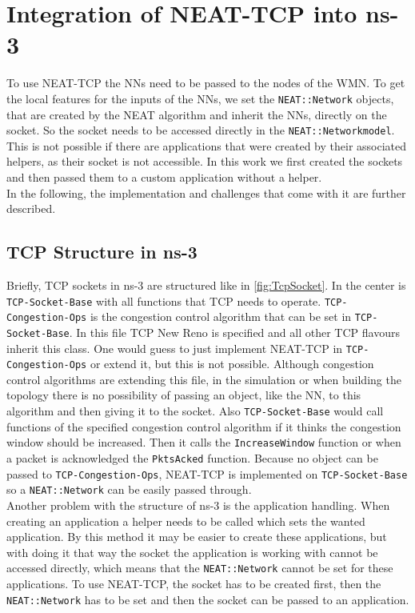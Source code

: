 \section{Integration of NEAT-TCP into ns-3}\label{sec:extensionns3}
To use NEAT-TCP the NNs need to be passed to the nodes of the WMN. To get the local features for the inputs of the NNs, we set the \texttt{NEAT::Network} objects, that are created by the NEAT algorithm and inherit the NNs, directly on the socket. 
So the socket needs to be accessed directly in the \texttt{NEAT::Networkmodel}. This is not possible if there are applications that were created by their associated helpers, as their socket is not accessible. In this work we first created the sockets and then passed them to a custom application without a helper. \\
In the following, the implementation and challenges that come with it are further described.

\subsection{TCP Structure in ns-3}\label{subsec:tcpstruct}
Briefly, TCP sockets in ns-3 are structured like in \autoref{fig:TcpSocket}. In the center is \texttt{TCP-Socket-Base} with all functions that TCP needs to operate. \texttt{TCP-Congestion-Ops} is the congestion control algorithm that can be set in \texttt{TCP-Socket-Base}. In this file TCP New Reno is specified and all other TCP flavours inherit this class. One would guess to just implement NEAT-TCP in \texttt{TCP-Congestion-Ops} or extend it, but this is not possible. Although congestion control algorithms are extending this file, in the simulation or when building the topology there is no possibility of passing an object, like the NN, to this algorithm and then giving it to the socket. Also \texttt{TCP-Socket-Base} would call functions of the specified congestion control algorithm if it thinks the congestion window should be increased. Then it calls the \texttt{IncreaseWindow} function or when a packet is acknowledged the \texttt{PktsAcked} function. Because no object can be passed to \texttt{TCP-Congestion-Ops}, NEAT-TCP is implemented on \texttt{TCP-Socket-Base} so a \texttt{NEAT::Network} can be easily passed through. \\
Another problem with the structure of ns-3 is the application handling. When creating an application a helper needs to be called which sets the wanted application. By this method it may be easier to create these applications, but with doing it that way the socket the application is working with cannot be accessed directly, which means that the \texttt{NEAT::Network} cannot be set for these applications. To use NEAT-TCP, the socket has to be created first, then the \texttt{NEAT::Network} has to be set and then the socket can be passed to an application.


